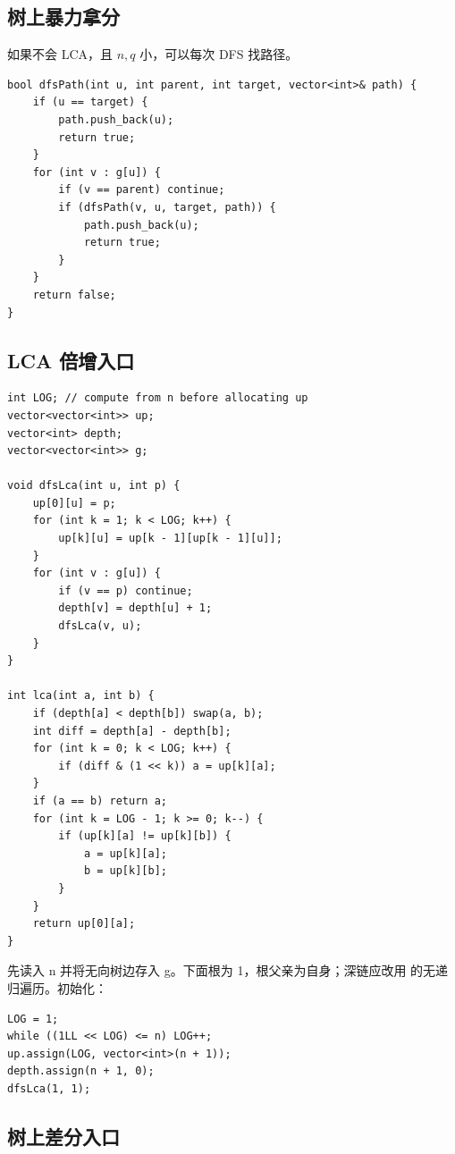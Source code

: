 \subsection{树上暴力拿分}

如果不会 LCA，且 $n,q$ 小，可以每次 DFS 找路径。

\begin{lstlisting}
bool dfsPath(int u, int parent, int target, vector<int>& path) {
    if (u == target) {
        path.push_back(u);
        return true;
    }
    for (int v : g[u]) {
        if (v == parent) continue;
        if (dfsPath(v, u, target, path)) {
            path.push_back(u);
            return true;
        }
    }
    return false;
}
\end{lstlisting}

\subsection{LCA 倍增入口}

\begin{lstlisting}
int LOG; // compute from n before allocating up
vector<vector<int>> up;
vector<int> depth;
vector<vector<int>> g;

void dfsLca(int u, int p) {
    up[0][u] = p;
    for (int k = 1; k < LOG; k++) {
        up[k][u] = up[k - 1][up[k - 1][u]];
    }
    for (int v : g[u]) {
        if (v == p) continue;
        depth[v] = depth[u] + 1;
        dfsLca(v, u);
    }
}

int lca(int a, int b) {
    if (depth[a] < depth[b]) swap(a, b);
    int diff = depth[a] - depth[b];
    for (int k = 0; k < LOG; k++) {
        if (diff & (1 << k)) a = up[k][a];
    }
    if (a == b) return a;
    for (int k = LOG - 1; k >= 0; k--) {
        if (up[k][a] != up[k][b]) {
            a = up[k][a];
            b = up[k][b];
        }
    }
    return up[0][a];
}
\end{lstlisting}

先读入 n 并将无向树边存入 g。下面根为 1，根父亲为自身；深链应改用  的无递归遍历。初始化：

\begin{lstlisting}
LOG = 1;
while ((1LL << LOG) <= n) LOG++;
up.assign(LOG, vector<int>(n + 1));
depth.assign(n + 1, 0);
dfsLca(1, 1);
\end{lstlisting}

\subsection{树上差分入口}

